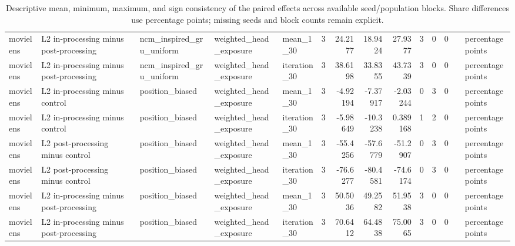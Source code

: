 \begin{table}[htbp!]
\begin{tabular}{lllllrrrrrrrll}
movielens & L2 in-processing minus post-processing & ncm\_inspired\_gru\_uniform & weighted\_head\_exposure & mean\_1\_30 & 3 & 24.2177 & 18.9424 & 27.9377 & 3 & 0 & 0 &  & percentage points \\
movielens & L2 in-processing minus post-processing & ncm\_inspired\_gru\_uniform & weighted\_head\_exposure & iteration\_30 & 3 & 38.6198 & 33.8355 & 43.7339 & 3 & 0 & 0 &  & percentage points \\
movielens & L2 in-processing minus control & position\_biased & weighted\_head\_exposure & mean\_1\_30 & 3 & -4.92194 & -7.37917 & -2.03244 & 0 & 3 & 0 &  & percentage points \\
movielens & L2 in-processing minus control & position\_biased & weighted\_head\_exposure & iteration\_30 & 3 & -5.98649 & -10.3238 & 0.389168 & 1 & 2 & 0 &  & percentage points \\
movielens & L2 post-processing minus control & position\_biased & weighted\_head\_exposure & mean\_1\_30 & 3 & -55.4256 & -57.6779 & -51.2907 & 0 & 3 & 0 &  & percentage points \\
movielens & L2 post-processing minus control & position\_biased & weighted\_head\_exposure & iteration\_30 & 3 & -76.6277 & -80.4581 & -74.6174 & 0 & 3 & 0 &  & percentage points \\
movielens & L2 in-processing minus post-processing & position\_biased & weighted\_head\_exposure & mean\_1\_30 & 3 & 50.5036 & 49.2582 & 51.9538 & 3 & 0 & 0 &  & percentage points \\
movielens & L2 in-processing minus post-processing & position\_biased & weighted\_head\_exposure & iteration\_30 & 3 & 70.6412 & 64.4838 & 75.0065 & 3 & 0 & 0 &  & percentage points \\
\hline
\end{tabular}
\caption{Descriptive mean, minimum, maximum, and sign consistency of the paired effects across available seed/population blocks. Share differences use percentage points; missing seeds and block counts remain explicit.}
\label{chap:results:tab:rq4_seed_consistency_weighted_head_exposure}
\end{table}

